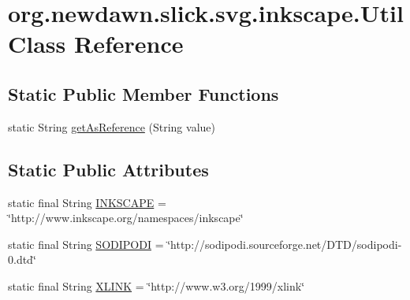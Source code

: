 \hypertarget{classorg_1_1newdawn_1_1slick_1_1svg_1_1inkscape_1_1_util}{}\section{org.\+newdawn.\+slick.\+svg.\+inkscape.\+Util Class Reference}
\label{classorg_1_1newdawn_1_1slick_1_1svg_1_1inkscape_1_1_util}
\subsection*{Static Public Member Functions}
\begin{DoxyCompactItemize}
\item 
static String \mbox{\hyperlink{classorg_1_1newdawn_1_1slick_1_1svg_1_1inkscape_1_1_util_a5c5c9cf51e4c8021b7eeac2714142a1f}{get\+As\+Reference}} (String value)
\end{DoxyCompactItemize}
\subsection*{Static Public Attributes}
\begin{DoxyCompactItemize}
\item 
static final String \mbox{\hyperlink{classorg_1_1newdawn_1_1slick_1_1svg_1_1inkscape_1_1_util_af7a7fcda04b0fd373a2ed92aa5e26cdc}{I\+N\+K\+S\+C\+A\+PE}} = \char`\"{}http\+://www.\+inkscape.\+org/namespaces/inkscape\char`\"{}
\item 
static final String \mbox{\hyperlink{classorg_1_1newdawn_1_1slick_1_1svg_1_1inkscape_1_1_util_ae8d1dafc96d1e9a111de141dcc6f6d6f}{S\+O\+D\+I\+P\+O\+DI}} = \char`\"{}http\+://sodipodi.\+sourceforge.\+net/D\+TD/sodipodi-\/0.dtd\char`\"{}
\item 
static final String \mbox{\hyperlink{classorg_1_1newdawn_1_1slick_1_1svg_1_1inkscape_1_1_util_acaa162b07865246ad8a853344f83abd2}{X\+L\+I\+NK}} = \char`\"{}http\+://www.\+w3.\+org/1999/xlink\char`\"{}
\end{DoxyCompactItemize}
